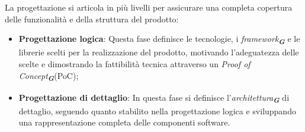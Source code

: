 La progettazione si articola in più livelli per assicurare una completa copertura delle funzionalità e della struttura del prodotto:
\begin{itemize}
    \item \textbf{Progettazione logica}: Questa fase definisce le tecnologie, i \emph{framework}\textsubscript{\textit{\textbf{G}}} e le librerie scelti per la realizzazione del prodotto, motivando l'adeguatezza delle scelte e dimostrando la fattibilità tecnica attraverso un \emph{Proof of Concept}\textsubscript{\textit{\textbf{G}}}(PoC);
    \item \textbf{Progettazione di dettaglio}: In questa fase si definisce l'\emph{architettura}\textsubscript{\textit{\textbf{G}}} di dettaglio, seguendo quanto stabilito nella progettazione logica e sviluppando una rappresentazione completa delle componenti software.
\end{itemize}


